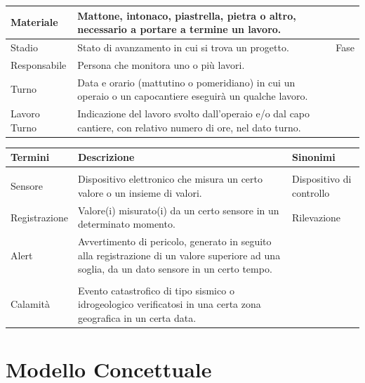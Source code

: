 \documentclass[12pt,a4paper]{report}
\begin{document}
\begin{center}
\begin{tabular}{|p{3cm}|p{8cm}|p{3cm}|}
            \hline
            Materiale&Mattone, intonaco, piastrella, pietra o altro, necessario a portare a termine un lavoro. & \\
            \hline
            Stadio&Stato di avanzamento in cui si trova un progetto.&Fase \\
            \hline
            Responsabile&Persona che monitora uno o più lavori.& \\
            \hline
            Turno&Data e orario (mattutino o pomeridiano) in cui un operaio o un capocantiere eseguirà un qualche lavoro. & \\
            \hline
            Lavoro Turno&Indicazione del lavoro svolto dall'operaio e/o dal capo cantiere, con relativo numero di ore, nel dato turno.& \\
            \hline
        \end{tabular}
            \newpage
               
        \begin{tabular}{|p{3cm}|p{8cm}|p{3cm}|}
            \hline
            \textbf{Termini} & \textbf{Descrizione} & \textbf{Sinonimi} \\
            \hline
            \rowcolor{verde}
            \multicolumn{3}{|c|}{\textbf{Area Monitoraggio}} \\
            \hline
            Sensore&Dispositivo elettronico che misura un certo valore o un insieme di valori.&Dispositivo di controllo \\
            \hline
            Registrazione&Valore(i) misurato(i) da un certo sensore in un determinato momento.&Rilevazione \\
            \hline
            Alert&Avvertimento di pericolo, generato in seguito alla registrazione di un valore superiore ad una soglia, da un dato sensore in un certo tempo. & \\
            \hline
            \rowcolor{rosso}
            \multicolumn{3}{|c|}{\textbf{Area Analisi del Rischio}} \\
            \hline
            Calamità&Evento catastrofico di tipo sismico o idrogeologico verificatosi in una certa zona geografica in un certa data. & \\
            \hline
        \end{tabular}
    \end{center}


\part{Modello Concettuale}
\end{document}
